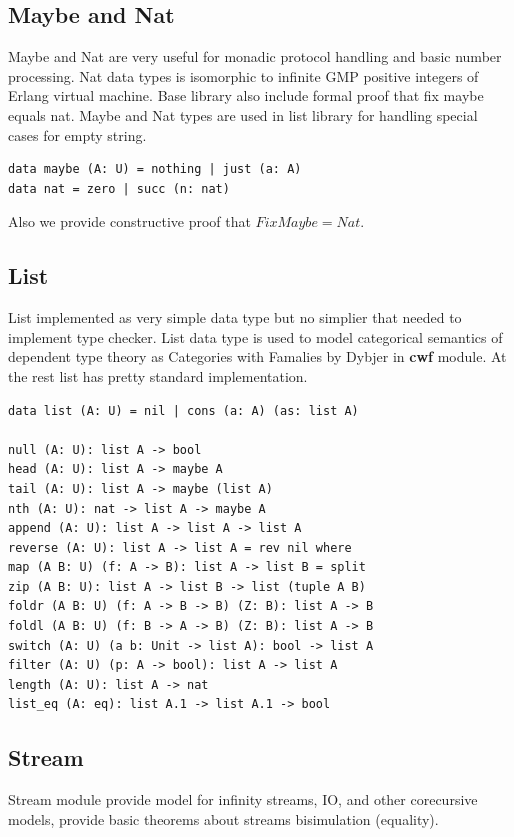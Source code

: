 \documentclass{article}
\begin{document}
\subsection{Maybe and Nat}

Maybe and Nat are very useful for monadic protocol handling
and basic number processing. Nat data types is isomorphic
to infinite GMP positive integers of Erlang virtual machine.
Base library also include formal proof that fix maybe equals nat.
Maybe and Nat types are used in list library for handling special cases
for empty string.

\begin{lstlisting}[mathescape=true]
data maybe (A: U) = nothing | just (a: A)
data nat = zero | succ (n: nat)
\end{lstlisting}

Also we provide constructive proof that $Fix Maybe = Nat$.

\subsection{List}

List implemented as very simple data type but no simplier
that needed to implement type checker. List data type is
used to model categorical semantics of dependent type theory
as Categories with Famalies by Dybjer in {\bf cwf} module.
At the rest list has pretty standard implementation.

\begin{lstlisting}[mathescape=true]
data list (A: U) = nil | cons (a: A) (as: list A)

null (A: U): list A -> bool
head (A: U): list A -> maybe A
tail (A: U): list A -> maybe (list A)
nth (A: U): nat -> list A -> maybe A
append (A: U): list A -> list A -> list A
reverse (A: U): list A -> list A = rev nil where
map (A B: U) (f: A -> B): list A -> list B = split
zip (A B: U): list A -> list B -> list (tuple A B)
foldr (A B: U) (f: A -> B -> B) (Z: B): list A -> B
foldl (A B: U) (f: B -> A -> B) (Z: B): list A -> B
switch (A: U) (a b: Unit -> list A): bool -> list A
filter (A: U) (p: A -> bool): list A -> list A
length (A: U): list A -> nat
list_eq (A: eq): list A.1 -> list A.1 -> bool
\end{lstlisting}

\subsection{Stream}

Stream module provide model for infinity streams, IO, and other corecursive models,
provide basic theorems about streams bisimulation (equality).
\end{document}
